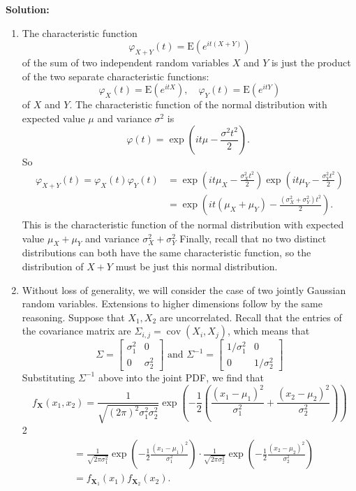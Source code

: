 \documentclass[13pt]{article}
\theoremstyle{definition}
\newenvironment{solution}
{\color{C2}\begin{framed}\begingroup\textbf{Solution:} }
  {\endgroup\end{framed}}
\theoremstyle{remark}
\begin{document}
\begin{solution}
\begin{enumerate}[label=(\alph*)]
        \item The characteristic function
$$
\varphi_{X+Y}(t)=\mathrm{E}\left(e^{i t(X+Y)}\right)
$$
of the sum of two independent random variables $X$ and $Y$ is just the product of the two separate characteristic functions:
$$
\varphi_X(t)=\mathrm{E}\left(e^{i t X}\right), \quad \varphi_Y(t)=\mathrm{E}\left(e^{i t Y}\right)
$$
of $X$ and $Y$.
The characteristic function of the normal distribution with expected value $\mu$ and variance $\sigma^2$ is
$$
\varphi(t)=\exp \left(i t \mu-\frac{\sigma^2 t^2}{2}\right) \text {. }
$$
So
$$
\begin{aligned}
\varphi_{X+Y}(t)=\varphi_X(t) \varphi_Y(t) & =\exp \left(i t \mu_X-\frac{\sigma_X^2 t^2}{2}\right) \exp \left(i t \mu_Y-\frac{\sigma_Y^2 t^2}{2}\right) \\
& =\exp \left(i t\left(\mu_X+\mu_Y\right)-\frac{\left(\sigma_X^2+\sigma_Y^2\right) t^2}{2}\right) .
\end{aligned}
$$
This is the characteristic function of the normal distribution with expected value $\mu_X+\mu_Y$ and variance $\sigma_X^2+\sigma_Y^2$ Finally, recall that no two distinct distributions can both have the same characteristic function, so the distribution of $X+Y$ must be just this normal distribution.

\item Without loss of generality, we will consider the case of two jointly Gaussian random variables. Extensions to higher dimensions follow by the same reasoning. Suppose that $X_1, X_2$ are uncorrelated. Recall that the entries of the covariance matrix are $\Sigma_{i, j}=\operatorname{cov}\left(X_i, X_j\right)$, which means that
$$
\Sigma=\left[\begin{array}{cc}
\sigma_1^2 & 0 \\
0 & \sigma_2^2
\end{array}\right] \text { and } \Sigma^{-1}=\left[\begin{array}{cc}
1 / \sigma_1^2 & 0 \\
0 & 1 / \sigma_2^2
\end{array}\right]
$$
Substituting $\Sigma^{-1}$ above into the joint PDF, we find that
$$
f_{\mathbf{X}}\left(x_1, x_2\right)=\frac{1}{\sqrt{(2 \pi)^2 \sigma_1^2 \sigma_2^2}} \exp \left(-\frac{1}{2}\left(\frac{\left(x_1-\mu_1\right)^2}{\sigma_1^2}+\frac{\left(x_2-\mu_2\right)^2}{\sigma_2^2}\right)\right)
$$
2
$$
\begin{aligned}
& =\frac{1}{\sqrt{2 \pi \sigma_1^2}} \exp \left(-\frac{1}{2} \frac{\left(x_1-\mu_1\right)^2}{\sigma_1^2}\right) \cdot \frac{1}{\sqrt{2 \pi \sigma_2^2}} \exp \left(-\frac{1}{2} \frac{\left(x_2-\mu_2\right)^2}{\sigma_2^2}\right) \\
& =f_{\mathbf{X}_1}\left(x_1\right) f_{\mathbf{X}_2}\left(x_2\right) .
\end{aligned}
$$


\end{enumerate}
\end{solution}
\end{document}
